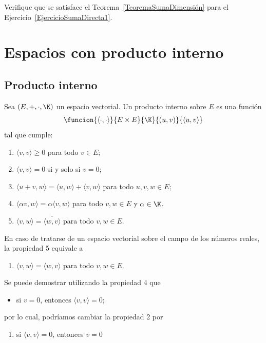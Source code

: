 \documentclass[compacto,10pt]{pubciencias-notas}
\begin{document}
\begin{ejer}\hspace{0pt} Verifique que se satisface el Teorema~\ref{TeoremaSumaDimensión} para el Ejercicio~\ref{EjercicioSumaDirecta1}.
    
\end{ejer}

\setcounter{section}{4}
\section{Espacios con producto interno}
\subsection{Producto interno}

\begin{defi}
    Sea $(E,+,\cdot,\K)$ un espacio vectorial. Un producto interno sobre $E$ es una función
    \[
        \funcion{\langle  \cdot, \cdot \rangle }{E\times E}{\K}{(u,v)}{\langle  u, v \rangle }
    \]
    tal que cumple:
    \begin{enumerate}
        \item 
            $\langle  v, v \rangle  \geq 0$ para todo $ v \in E$;
        \item 
            $\langle  v,v \rangle  = 0$ si y solo si $ v = 0$;
        \item 
            $\langle  u + v, w \rangle  = \langle  u,w \rangle  + \langle  v,w\rangle  $ para todo $u,v,w \in E$;
        \item
            $\langle  \alpha v,w \rangle  = \alpha \langle  v,w \rangle $ para todo $v,w \in E$ y $\alpha\in\K$.
        \item
            $\langle  v,w \rangle  = \overline{\langle w, v \rangle}$ para todo $v,w \in E$.
    \end{enumerate}
\end{defi}


\begin{advertencia}
    En caso de tratarse de un espacio vectorial sobre el campo de los números reales, la propiedad 5 equivale a
    \begin{enumerate}[start=5]
        \item
            $\langle  v,w \rangle  = \langle  w, v \rangle $ para todo $v,w \in E$.
    \end{enumerate}
\end{advertencia}


\begin{advertencia}
    Se puede demostrar utilizando la propiedad 4 que
    \begin{itemize}
        \item
            si $v = 0$, entonces $\langle  v,v \rangle  = 0$;
    \end{itemize}
    por lo cual, podríamos cambiar la propiedad 2 por
    \begin{enumerate}[start=2]
        \item
            si $\langle  v,v \rangle  = 0$, entonces $ v = 0$
    \end{enumerate}
\end{advertencia}
\end{document}
